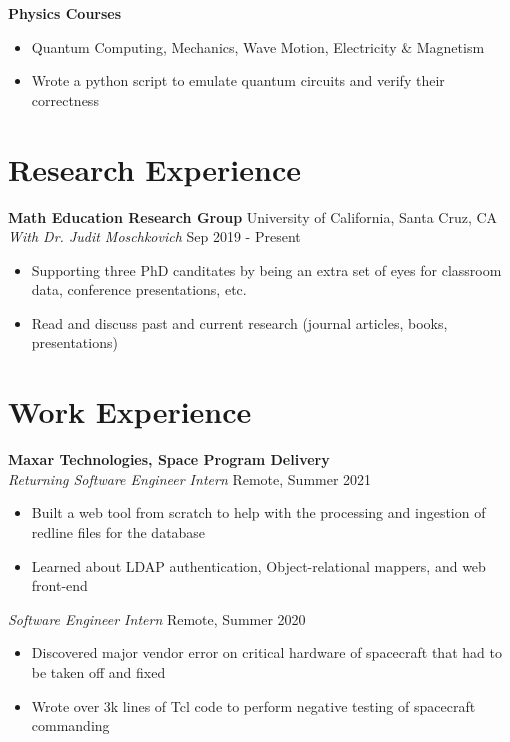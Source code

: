 \documentclass[10pt,letterpaper]{article}
\begin{document}
\textbf{Physics Courses}
\begin{itemize}
    \item Quantum Computing, Mechanics, Wave Motion, Electricity \& Magnetism
    \item Wrote a python script to emulate quantum circuits and verify their correctness
\end{itemize}


\section*{Research Experience} \hrulefill

\textbf{Math Education Research Group} \hfill University of California, Santa Cruz, CA\\
\textit{With Dr. Judit Moschkovich} \hfill Sep 2019 - Present
\begin{itemize}
    \item Supporting three PhD canditates by being an extra set of eyes for classroom data, conference presentations, etc.
    \item Read and discuss past and current research (journal articles, books, presentations)
\end{itemize}


\section*{Work Experience} \hrulefill 

\textbf{Maxar Technologies, Space Program Delivery}\\
\textit{Returning Software Engineer Intern} \hfill Remote, Summer 2021
\begin{itemize}
    \item Built a web tool from scratch to help with the processing and ingestion of redline files for the database
    \item Learned about LDAP authentication, Object-relational mappers, and web front-end
\end{itemize}
\textit{Software Engineer Intern} \hfill Remote, Summer 2020
\begin{itemize}
    \item Discovered major vendor error on critical hardware of spacecraft that had to be taken off and fixed
    \item Wrote over 3k lines of Tcl code to perform negative testing of spacecraft commanding
\end{itemize}
%
%
\end{document}
